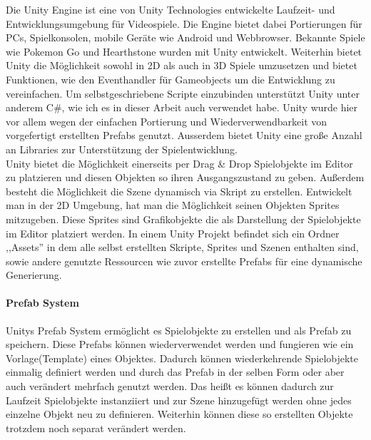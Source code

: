 Die Unity Engine ist eine von Unity Technologies entwickelte Laufzeit- und Entwicklungsumgebung für Videospiele. Die Engine bietet dabei Portierungen für PCs, Spielkonsolen, mobile Geräte wie Android und Webbrowser. Bekannte Spiele wie Pokemon Go und Hearthstone wurden mit Unity entwickelt. Weiterhin bietet Unity die Möglichkeit sowohl in 2D als auch in 3D Spiele umzusetzen und bietet Funktionen, wie den Eventhandler für Gameobjects um die Entwicklung zu vereinfachen. Um selbstgeschriebene Scripte einzubinden unterstützt Unity unter anderem C\#, wie ich es in dieser Arbeit auch verwendet habe. Unity wurde hier vor allem wegen der einfachen Portierung und Wiederverwendbarkeit von vorgefertigt erstellten Prefabs genutzt. Ausserdem bietet Unity eine große Anzahl an Libraries zur Unterstützung der Spielentwicklung. \\Unity bietet die Möglichkeit einerseits per Drag \& Drop Spielobjekte im Editor zu platzieren und diesen Objekten so ihren Ausgangszustand zu geben. Außerdem besteht die Möglichkeit die Szene dynamisch via Skript zu erstellen. Entwickelt man in der 2D Umgebung, hat man die Möglichkeit seinen Objekten Sprites mitzugeben. Diese Sprites sind Grafikobjekte die als Darstellung der Spielobjekte im Editor platziert werden. In einem Unity Projekt befindet sich ein Ordner ,,Assets'' in dem alle selbst erstellten Skripte, Sprites und Szenen enthalten sind, sowie andere genutzte Ressourcen wie zuvor erstellte Prefabs für eine dynamische Generierung.

\paragraph{Prefab System}
\nocite{UPrefabs}
Unitys Prefab System ermöglicht es Spielobjekte zu erstellen und als Prefab zu speichern. Diese Prefabs können wiederverwendet werden und fungieren wie ein Vorlage(Template) eines Objektes. Dadurch können wiederkehrende Spielobjekte einmalig definiert werden und durch das Prefab in der selben Form oder aber auch verändert mehrfach genutzt werden. Das heißt es können dadurch zur Laufzeit Spielobjekte instanziiert und zur Szene hinzugefügt werden ohne jedes einzelne Objekt neu zu definieren. Weiterhin können diese so erstellten Objekte trotzdem noch separat verändert werden.


